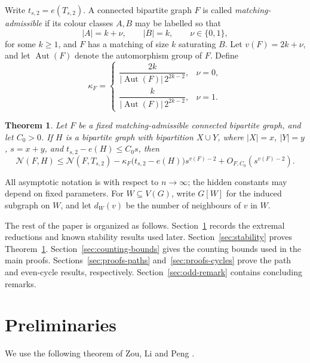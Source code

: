 \documentclass[11pt]{article}
\newtheorem{theorem}{Theorem}[section]
\theoremstyle{definition}
\theoremstyle{plain}
\theoremstyle{remark}
\theoremstyle{plain}
\numberwithin{equation}{section}
\DeclareMathOperator{\Aut}{Aut}
\newcommand{\N}{\mathcal N}
\begin{document}
Write $t_{s,2}=e(T_{s,2})$. 
A connected bipartite graph $F$ is called \emph{matching-admissible} if its colour classes $A,B$ may be labelled so that
\begin{equation}
        |A|=k+\nu,\qquad |B|=k,\qquad \nu\in\{0,1\},
        \label{eq:admissible-sizes}
\end{equation}
for some $k\ge1$, and $F$ has a matching of size $k$ saturating $B$. Let $v(F)=2k+\nu$, and let $\Aut(F)$ denote the automorphism group of $F$. Define
\begin{equation}
        \kappa_F=
        \begin{cases}
        \dfrac{2k}{|\Aut(F)|\,2^{2k-2}}, & \nu=0,\\[1.1ex]
        \dfrac{k}{|\Aut(F)|\,2^{2k-2}}, & \nu=1.
        \end{cases}
        \label{eq:kappa-F}
\end{equation}

\begin{theorem}\label{thm:local-counting}
Let $F$ be a fixed matching-admissible connected bipartite graph, and let $C_0>0$. If $H$ is a bipartite graph with bipartition $X\cup Y$, where $|X|=x$, $|Y|=y$, $s=x+y$, and $t_{s,2}-e(H)\le C_0s$, then
\[
        \N(F,H)\le \N(F,T_{s,2})-
        \kappa_F\bigl(t_{s,2}-e(H)\bigr)s^{v(F)-2}
        +O_{F,C_0}(s^{v(F)-2}).
\]
\end{theorem}



All asymptotic notation is with respect to $n\to\infty$; the hidden constants may depend on fixed parameters. For $W\subseteq V(G)$, write $G[W]$ for the induced subgraph on $W$, and let $d_W(v)$ be the number of neighbours of $v$ in $W$.

The rest of the paper is organized as follows. Section~\ref{sec:prelim} records the extremal reductions and known stability results used later. Section~\ref{sec:stability} proves Theorem~\ref{thm:local-counting}. Section~\ref{sec:counting-bounds} gives the counting bounds used in the main proofs. Sections~\ref{sec:proofs-paths} and~\ref{sec:proofs-cycles} prove the path and even-cycle results, respectively. Section~\ref{sec:odd-remark} contains concluding remarks.

\section{Preliminaries}\label{sec:prelim}

We use the following theorem of Zou, Li and Peng \cite{ZouLiPeng2025}.
\end{document}
